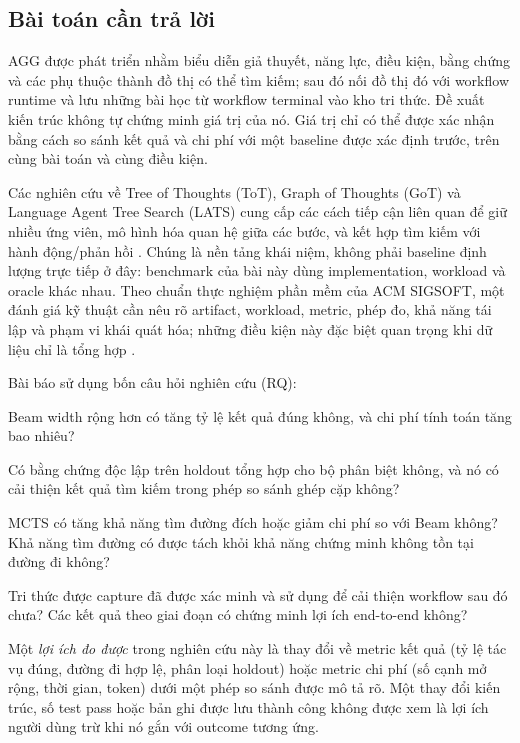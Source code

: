 \documentclass[11pt,a4paper]{article}
\begin{document}
\subsection{Bài toán cần trả lời}
AGG được phát triển nhằm biểu diễn giả thuyết, năng lực, điều kiện, bằng chứng và các phụ thuộc thành đồ thị có thể tìm kiếm; sau đó nối đồ thị đó với workflow runtime và lưu những bài học từ workflow terminal vào kho tri thức. Đề xuất kiến trúc không tự chứng minh giá trị của nó. Giá trị chỉ có thể được xác nhận bằng cách so sánh kết quả và chi phí với một baseline được xác định trước, trên cùng bài toán và cùng điều kiện.

Các nghiên cứu về Tree of Thoughts (ToT), Graph of Thoughts (GoT) và Language Agent Tree Search (LATS) cung cấp các cách tiếp cận liên quan để giữ nhiều ứng viên, mô hình hóa quan hệ giữa các bước, và kết hợp tìm kiếm với hành động/phản hồi \cite{yao2023tot,besta2024got,zhou2024lats}. Chúng là nền tảng khái niệm, không phải baseline định lượng trực tiếp ở đây: benchmark của bài này dùng implementation, workload và oracle khác nhau. Theo chuẩn thực nghiệm phần mềm của ACM SIGSOFT, một đánh giá kỹ thuật cần nêu rõ artifact, workload, metric, phép đo, khả năng tái lập và phạm vi khái quát hóa; những điều kiện này đặc biệt quan trọng khi dữ liệu chỉ là tổng hợp \cite{acmsigsoftstandards}.

Bài báo sử dụng bốn câu hỏi nghiên cứu (RQ):
\begin{description}[style=nextline,leftmargin=1.7em]
\item[RQ1 -- Tìm kiếm Phase~1.] Beam width rộng hơn có tăng tỷ lệ kết quả đúng không, và chi phí tính toán tăng bao nhiêu?
\item[RQ2 -- Discriminator Phase~2.] Có bằng chứng độc lập trên holdout tổng hợp cho bộ phân biệt không, và nó có cải thiện kết quả tìm kiếm trong phép so sánh ghép cặp không?
\item[RQ3 -- MCTS Phase~3.] MCTS có tăng khả năng tìm đường đích hoặc giảm chi phí so với Beam không? Khả năng tìm đường có được tách khỏi khả năng chứng minh không tồn tại đường đi không?
\item[RQ4 -- Reuse Phase~4 và giá trị tổng thể.] Tri thức được capture đã được xác minh và sử dụng để cải thiện workflow sau đó chưa? Các kết quả theo giai đoạn có chứng minh lợi ích end-to-end không?
\end{description}

Một \emph{lợi ích đo được} trong nghiên cứu này là thay đổi về metric kết quả (tỷ lệ tác vụ đúng, đường đi hợp lệ, phân loại holdout) hoặc metric chi phí (số cạnh mở rộng, thời gian, token) dưới một phép so sánh được mô tả rõ. Một thay đổi kiến trúc, số test pass hoặc bản ghi được lưu thành công không được xem là lợi ích người dùng trừ khi nó gắn với outcome tương ứng.
\end{document}
